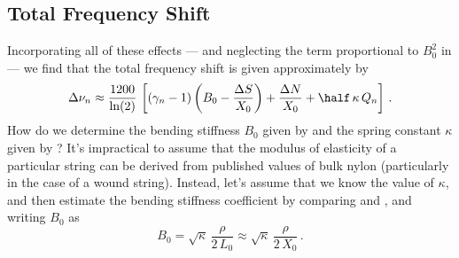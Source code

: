 \subsection{Total Frequency Shift\label{sct:tot_freq_shift}}

Incorporating all of these effects --- and neglecting the term proportional to $B_0^2$ in  --- we find that the total frequency shift is given approximately by
\begin{equation}\label{eqn:error_tot}
  \Delta \nu_n \approx \frac{1200}{\ln(2)}\, \left[ \left(\gamma_n - 1\right) \left(B_0 - \frac{\Delta S}{X_0}\right) + \frac{\Delta N}{X_0} + \half\, \kappa\, Q_n \right]\, .
\end{equation}
How do we determine the bending stiffness $B_0$ given by  and the spring constant $\kappa$ given by ? It's impractical to assume that the modulus of elasticity of a particular string can be derived from published values of bulk nylon (particularly in the case of a wound string). Instead, let's assume that we know the value of $\kappa$, and then estimate the bending stiffness coefficient by comparing  and , and writing $B_0$ as
\begin{equation} \label{eqn:b_0_kappa}
  B_0 = \sqrt{\kappa}\, \frac{\rho}{2\, L_0} \approx \sqrt{\kappa}\, \frac{\rho}{2\, X_0}\, .
\end{equation}

